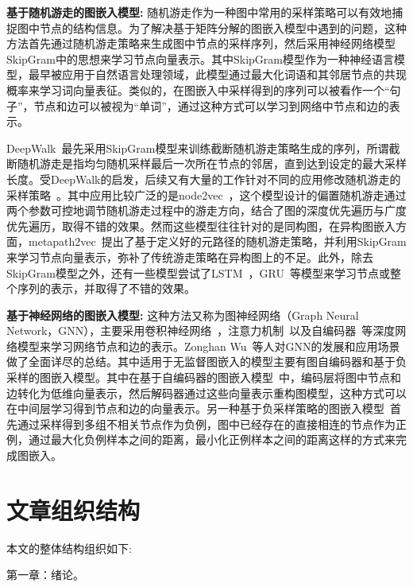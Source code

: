 \textbf{基于随机游走的图嵌入模型:}
随机游走作为一种图中常用的采样策略可以有效地捕捉图中节点的结构信息。为了解决基于矩阵分解的图嵌入模型中遇到的问题，这种方法首先通过随机游走策略来生成图中节点的采样序列，然后采用神经网络模型SkipGram\cite{corr/Mikolov13}中的思想来学习节点向量表示。其中SkipGram模型作为一种神经语言模型，最早被应用于自然语言处理领域，此模型通过最大化词语和其邻居节点的共现概率来学习词向量表征。类似的，在图嵌入中采样得到的序列可以被看作一个“句子”，节点和边可以被视为“单词”，通过这种方式可以学习到网络中节点和边的表示。

DeepWalk~\cite{kdd/Perozzi14}最先采用SkipGram模型来训练截断随机游走策略生成的序列，所谓截断随机游走是指均匀随机采样最后一次所在节点的邻居，直到达到设定的最大采样长度。受DeepWalk的启发，后续又有大量的工作针对不同的应用修改随机游走的采样策略~\cite{ijcnn/JinLLZZW16, kdd/GroverL16, icml/YangCS16}。其中应用比较广泛的是node2vec~\cite{kdd/GroverL16}，这个模型设计的偏置随机游走通过两个参数可控地调节随机游走过程中的游走方向，结合了图的深度优先遍历与广度优先遍历，取得不错的效果。然而这些模型往往针对的是同构图，在异构图嵌入方面，metapath2vec~\cite{kdd/DongCS17}提出了基于定义好的元路径的随机游走策略，并利用SkipGram来学习节点向量表示，弥补了传统游走策略在异构图上的不足。此外，除去SkipGram模型之外，还有一些模型尝试了LSTM~\cite{neco/HochreiterS97}，GRU~\cite{ssst/ChoMBB14}等模型来学习节点或整个序列的表示\cite{aaai/LiuZZZCWY17, www/LiMGM17}，并取得了不错的效果。

\textbf{基于神经网络的图嵌入模型:}
这种方法又称为图神经网络（Graph Neural Network，GNN），主要采用卷积神经网络~\cite{MP/Yann}，注意力机制~\cite{corr/VaswaniSPUJGKP17}以及自编码器~\cite{icml/VincentLBM08}等深度网络模型来学习网络节点和边的表示。Zonghan Wu~\cite{corr/Zonghan19}等人对GNN的发展和应用场景做了全面详尽的总结。其中适用于无监督图嵌入的模型主要有图自编码器和基于负采样的图嵌入模型。其中在基于自编码器的图嵌入模型~\cite{corr/KipfW16a, ijcai/PanHLJYZ18}中，编码层将图中节点和边转化为低维向量表示，然后解码器通过这些向量表示重构图模型，这种方式可以在中间层学习得到节点和边的向量表示。另一种基于负采样策略的图嵌入模型~\cite{nips/HamiltonYL17}首先通过采样得到多组不相关节点作为负例，图中已经存在的直接相连的节点作为正例，通过最大化负例样本之间的距离，最小化正例样本之间的距离这样的方式来完成图嵌入。

\section{文章组织结构}
本文的整体结构组织如下:

第一章：绪论。

